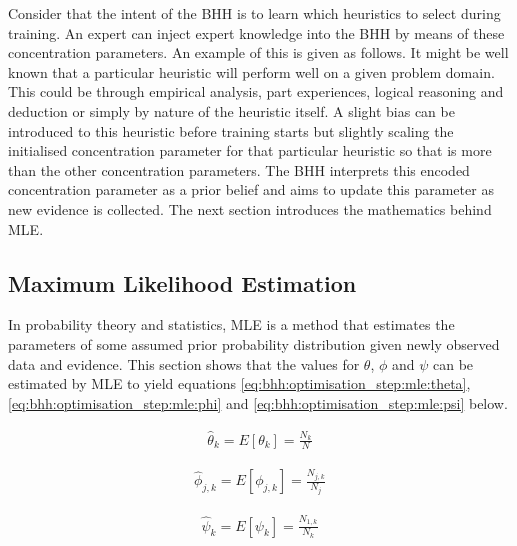 Consider that the intent of the \ac{BHH} is to learn which heuristics to select during training. An expert can inject expert knowledge into the \ac{BHH} by means of these concentration parameters. An example of this is given as follows. It might be well known that a particular heuristic will perform well on a given problem domain. This could be through empirical analysis, part experiences, logical reasoning and deduction or simply by nature of the heuristic itself. A slight bias can be introduced to this heuristic before training starts but slightly scaling the initialised concentration parameter for that particular heuristic so that is more than the other concentration parameters. The \ac{BHH} interprets this encoded concentration parameter as a prior belief and aims to update this parameter as new evidence is collected. The next section introduces the mathematics behind \ac{MLE}.

\subsection{Maximum Likelihood Estimation}
\label{sec:bhh:optimisation_step:mle}

In probability theory and statistics, \ac{MLE} is a method that estimates the parameters of some assumed prior probability distribution given newly observed data and evidence. This section shows that the values for $\theta$, $\phi$ and $\psi$ can be estimated by \ac{MLE} to yield equations \ref{eq:bhh:optimisation_step:mle:theta}, \ref{eq:bhh:optimisation_step:mle:phi} and \ref{eq:bhh:optimisation_step:mle:psi} below.

\begin{equation}
    \label{eq:bhh:optimisation_step:mle:theta}
    \begin{split}
        \hat{\theta}_{k} = E[\theta_{k}] = \frac{N_{k}}{N}
    \end{split}
\end{equation}

\begin{equation}
    \label{eq:bhh:optimisation_step:mle:phi}
    \begin{split}
        \hat{\phi}_{j,k} = E[\phi_{j,k}] = \frac{N_{j,k}}{N_{j}}
    \end{split}
\end{equation}

\begin{equation}
    \label{eq:bhh:optimisation_step:mle:psi}
    \begin{split}
        \hat{\psi}_{k} = E[\psi_{k}] = \frac{N_{1,k}}{N_{k}}
    \end{split}
\end{equation}


